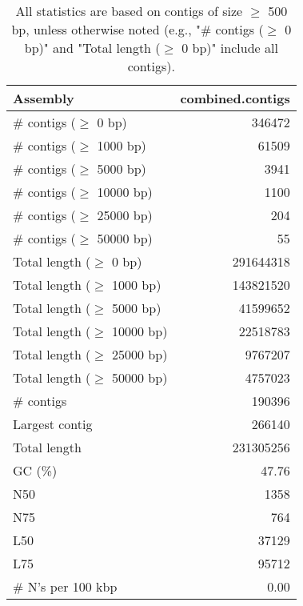 \documentclass[12pt,a4paper]{article}
\begin{document}
\begin{table}[ht]
\begin{center}
\caption{All statistics are based on contigs of size $\geq$ 500 bp, unless otherwise noted (e.g., "\# contigs ($\geq$ 0 bp)" and "Total length ($\geq$ 0 bp)" include all contigs).}
\begin{tabular}{|l*{1}{|r}|}
\hline
Assembly & combined.contigs \\ \hline
\# contigs ($\geq$ 0 bp) & 346472 \\ \hline
\# contigs ($\geq$ 1000 bp) & 61509 \\ \hline
\# contigs ($\geq$ 5000 bp) & 3941 \\ \hline
\# contigs ($\geq$ 10000 bp) & 1100 \\ \hline
\# contigs ($\geq$ 25000 bp) & 204 \\ \hline
\# contigs ($\geq$ 50000 bp) & 55 \\ \hline
Total length ($\geq$ 0 bp) & 291644318 \\ \hline
Total length ($\geq$ 1000 bp) & 143821520 \\ \hline
Total length ($\geq$ 5000 bp) & 41599652 \\ \hline
Total length ($\geq$ 10000 bp) & 22518783 \\ \hline
Total length ($\geq$ 25000 bp) & 9767207 \\ \hline
Total length ($\geq$ 50000 bp) & 4757023 \\ \hline
\# contigs & 190396 \\ \hline
Largest contig & 266140 \\ \hline
Total length & 231305256 \\ \hline
GC (\%) & 47.76 \\ \hline
N50 & 1358 \\ \hline
N75 & 764 \\ \hline
L50 & 37129 \\ \hline
L75 & 95712 \\ \hline
\# N's per 100 kbp & 0.00 \\ \hline
\end{tabular}
\end{center}
\end{table}
\end{document}
